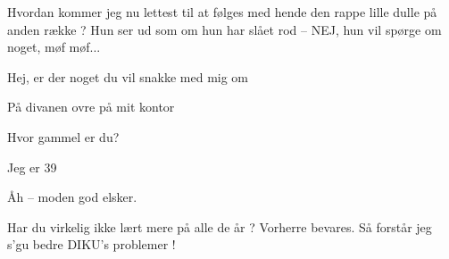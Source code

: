 \documentclass[a4paper,11pt]{article}
\begin{document}
\begin{sketch}
 Hvordan kommer jeg nu lettest til at følges med hende den rappe lille
dulle på anden række ?  Hun ser ud som om hun har slået rod -- NEJ, hun vil
spørge om noget, møf møf...

 Hej, er der noget du vil snakke med mig om

 På divanen ovre på mit kontor

 Hvor gammel er du?

 Jeg er 39

 Åh -- moden god elsker.

 Har du virkelig ikke lært mere på alle de år ? Vorherre bevares. Så
forstår jeg s'gu bedre DIKU's problemer !
\end{sketch}
\end{document}
